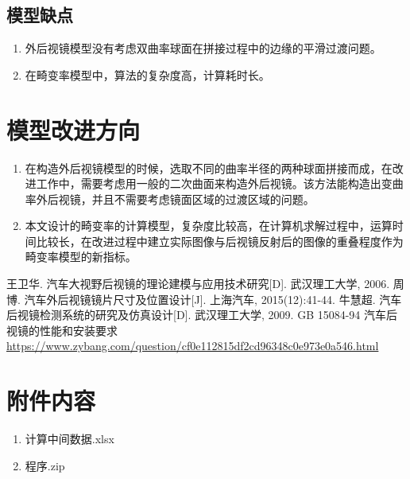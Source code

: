 \documentclass[withoutpreface,bwprint]{cumcmthesis} %
\begin{document}
\subsection{模型缺点}
\begin{enumerate}
	\item 外后视镜模型没有考虑双曲率球面在拼接过程中的边缘的平滑过渡问题。
	\item 在畸变率模型中，算法的复杂度高，计算耗时长。
\end{enumerate}
\section{模型改进方向}
\begin{enumerate}
	\item 在构造外后视镜模型的时候，选取不同的曲率半径的两种球面拼接而成，在改进工作中，需要考虑用一般的二次曲面来构造外后视镜。该方法能构造出变曲率外后视镜，并且不需要考虑镜面区域的过渡区域的问题。
	\item 本文设计的畸变率的计算模型，复杂度比较高，在计算机求解过程中，运算时间比较长，在改进过程中建立实际图像与后视镜反射后的图像的重叠程度作为畸变率模型的新指标。
\end{enumerate}


\begin{thebibliography}{9}%
  王卫华. 汽车大视野后视镜的理论建模与应用技术研究[D]. 武汉理工大学, 2006.
  周博. 汽车外后视镜镜片尺寸及位置设计[J]. 上海汽车, 2015(12):41-44.
  牛慧超. 汽车后视镜检测系统的研究及仿真设计[D]. 武汉理工大学, 2009.
  GB 15084-94 汽车后视镜的性能和安装要求
 \url{https://www.zybang.com/question/cf0e112815df2cd96348c0e973e0a546.html}
 
\end{thebibliography}

\newpage
\appendix

\section{附件内容}
\begin{enumerate}
	\item 计算中间数据.xlsx
	\item 程序.zip
\end{enumerate}
\end{document}

